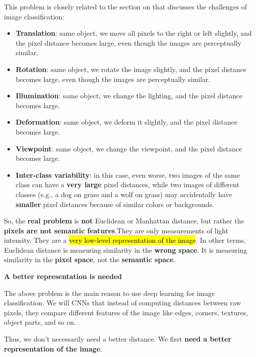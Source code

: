 \highspace
This problem is closely related to the section on  that discusses the challenges of image classification:
\begin{itemize}
    \item \textbf{Translation}: same object, we move all pixels to the right or left slightly, and the pixel distance becomes large, even though the images are perceptually similar.
    \item \textbf{Rotation}: same object, we rotate the image slightly, and the pixel distance becomes large, even though the images are perceptually similar.
    \item \textbf{Illumination}: same object, we change the lighting, and the pixel distance becomes large.
    \item \textbf{Deformation}: same object, we deform it slightly, and the pixel distance becomes large.
    \item \textbf{Viewpoint}: same object, we change the viewpoint, and the pixel distance becomes large.
    \item \textbf{Inter-class variability}: in this case, even worse, two images of the same class can have a \textbf{very large} pixel distances, while two images of different classes (e.g., a dog on grass and a wolf on grass) may accidentally have \textbf{smaller} pixel distances because of similar colors or backgrounds. 
\end{itemize}
\textcolor{Red2}{} So, the \textbf{real problem} is \textbf{not} Euclidean or Manhattan distance, but rather the \textbf{pixels are not semantic features}.They are only measurements of light intensity. They are a \hl{very low-level representation of the image}. In other terms, Euclidean distance is measuring similarity in the \textbf{wrong space}. It is measuring similarity in the \textbf{pixel space}, not the \textbf{semantic space}.

\highspace
\begin{flushleft}
    \textcolor{Green3}{ \textbf{A better representation is needed}}
\end{flushleft}
The above problem is the main reason to use deep learning for image classification. We will CNNs that instead of computing distances between raw pixels, they compare different features of the image like edges, corners, textures, object parts, and so on.

\highspace
Thus, we don't necessarily need a better distance. We first \textbf{need a better representation of the image}.

